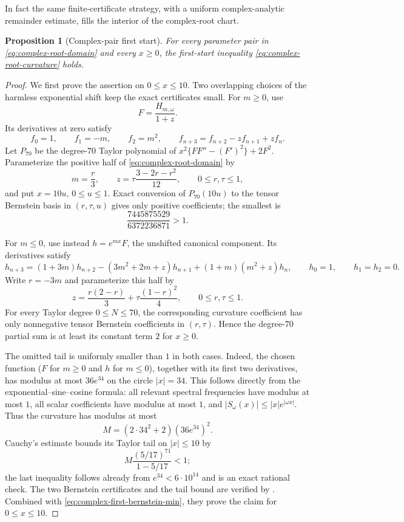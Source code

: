 \documentclass[11pt]{article}
\newtheorem{proposition}[theorem]{Proposition}
\theoremstyle{remark}
\begin{document}
In fact the same finite-certificate strategy, with a uniform complex-analytic
remainder estimate, fills the interior of the complex-root chart.
\begin{proposition}[Complex-pair first start]
\label{prop:complex-first}
For every parameter pair in \eqref{eq:complex-root-domain} and every
$x\geq0$, the first-start inequality
\eqref{eq:complex-root-curvature} holds.
\end{proposition}
\begin{proof}
We first prove the assertion on $0\leq x\leq10$.  Two overlapping choices of
the harmless exponential shift keep the exact certificates small.  For
$m\geq0$, use
\[
 F=\frac{H_{m,\omega}}{1+z}.
\]
Its derivatives at zero satisfy
\[
 f_0=1,\qquad f_1=-m,\qquad f_2=m^2,
 \qquad f_{n+3}=f_{n+2}-zf_{n+1}+zf_n.
\]
Let $P_{70}$ be the degree-$70$ Taylor polynomial of
$x^2\{FF''-(F')^2\}+2F^2$.  Parameterize the positive half of
\eqref{eq:complex-root-domain} by
\[
 m=\frac r3,\qquad
 z=\tau\frac{3-2r-r^2}{12},\qquad 0\leq r,\tau\leq1,
\]
and put $x=10u$, $0\leq u\leq1$.  Exact conversion of
$P_{70}(10u)$ to the tensor Bernstein basis in $(r,\tau,u)$ gives only
positive coefficients; the smallest is
\begin{equation}\label{eq:complex-first-bernstein-min}
 \frac{7445875529}{6372236871}>1.
\end{equation}

For $m\leq0$, use instead
$h=e^{mx}F$, the unshifted canonical component.  Its derivatives satisfy
\[
 h_{n+3}=(1+3m)h_{n+2}-(3m^2+2m+z)h_{n+1}
 +(1+m)(m^2+z)h_n,
 \qquad h_0=1,\qquad h_1=h_2=0.
\]
Write $r=-3m$ and parameterize this half by
\[
 z=\frac{r(2-r)}3+\tau\frac{(1-r)^2}{4},\qquad
 0\leq r,\tau\leq1.
\]
For every Taylor degree $0\leq N\leq70$, the corresponding curvature
coefficient has only nonnegative tensor Bernstein coefficients in
$(r,\tau)$.  Hence the degree-$70$ partial sum is at least its constant
term $2$ for $x\geq0$.

The omitted tail is uniformly smaller than $1$ in both cases.  Indeed, the
chosen function ($F$ for $m\geq0$ and $h$ for $m\leq0$), together with its
first two derivatives, has modulus at most $36e^{34}$ on the circle
$|x|=34$.  This follows directly from the exponential--sine--cosine formula:
all relevant spectral frequencies have modulus at most $1$, all scalar
coefficients have modulus at most $1$, and
$|S_\omega(x)|\leq |x|e^{|\omega x|}$.  Thus the curvature has modulus at
most
\[
 M=(2\cdot34^2+2)(36e^{34})^2.
\]
Cauchy's estimate bounds its Taylor tail on $|x|\leq10$ by
\[
 M\frac{(5/17)^{71}}{1-5/17}<1;
\]
the last inequality follows already from $e^{34}<6\cdot10^{14}$ and is an
exact rational check.  The two Bernstein certificates and the tail bound
are verified by .  Combined with
\eqref{eq:complex-first-bernstein-min}, they prove the claim for
$0\leq x\leq10$.


\end{proof}
\end{document}
